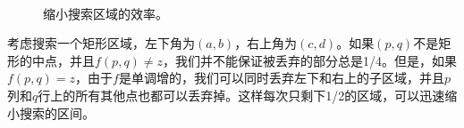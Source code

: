 \documentclass[UTF8]{article}
\begin{document}
\begin{figure}[htbp]
 \centering
  \\
 \caption{缩小搜索区域的效率。}
 \label{fig:saddleback-drop}
\end{figure}

考虑搜索一个矩形区域，左下角为$(a, b)$，右上角为$(c, d)$。如果$(p, q)$不是矩形的中点，并且$f(p, q) \neq z$，我们并不能保证被丢弃的部分总是1/4。但是，如果$f(p, q) = z$，由于$f$是单调增的，我们可以同时丢弃左下和右上的子区域，并且$p$列和$q$行上的所有其他点也都可以丢弃掉。这样每次只剩下1/2的区域，可以迅速缩小搜索的区间。
\end{document}

